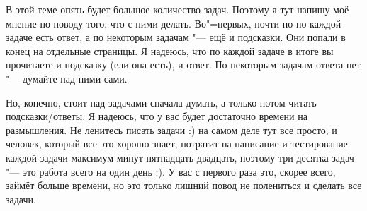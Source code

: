 В этой теме опять будет большое количество задач. Поэтому я тут напишу моё мнение по поводу того, что с ними делать.
Во"=первых, почти по по каждой задаче есть ответ, а по некоторым задачам "--- ещё и подсказки. Они попали в конец 
на отдельные страницы. Я надеюсь, что по каждой задаче в итоге вы прочитаете и подсказку (ели она есть), и ответ.
По некоторым задачам ответа нет "--- думайте над ними сами.

Но, конечно, стоит над задачами сначала думать, а только потом читать подсказки/ответы. Я надеюсь,
что у вас будет достаточно времени на размышления. Не ленитесь писать задачи :) на самом деле тут все просто,
и человек, который все это хорошо знает, потратит на написание и тестирование каждой задачи максимум минут 
пятнадцать-двадцать, поэтому три десятка задач "--- это работа всего на один день :). У вас с первого раза это, 
скорее всего, займёт больше времени, но это только лишний повод не полениться
и сделать все задачи.

